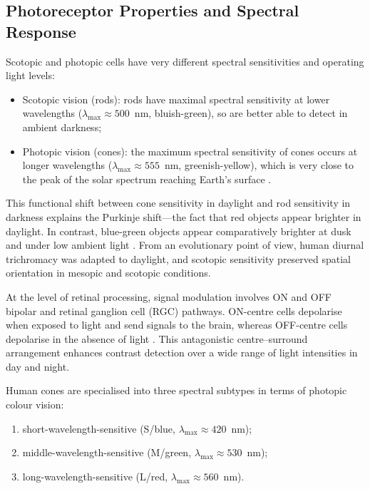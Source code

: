 \documentclass[brainsci,article,submit,moreauthors]{Definitions/mdpi}
\begin{document}
\subsection{Photoreceptor Properties and Spectral Response}

Scotopic and photopic cells have very different spectral sensitivities and operating light levels:

\begin{itemize}
\item Scotopic vision (rods): rods have maximal spectral sensitivity at lower wavelengths ($\lambda_{\max} \approx 500$~nm, bluish-green), so are better able to detect in ambient darkness;
\item Photopic vision (cones): the maximum spectral sensitivity of cones occurs at longer wavelengths ($\lambda_{\max} \approx 555$~nm, greenish-yellow), which is very close to the peak of the solar spectrum reaching Earth's surface \citep{stockman2000}.
\end{itemize}

This functional shift between cone sensitivity in daylight and rod sensitivity in darkness explains the Purkinje shift---the fact that red objects appear brighter in daylight. In contrast, blue-green objects appear comparatively brighter at dusk and under low ambient light \citep{purkinje1825,lamb2013}. From an evolutionary point of view, human diurnal trichromacy was adapted to daylight, and scotopic sensitivity preserved spatial orientation in mesopic and scotopic conditions.

At the level of retinal processing, signal modulation involves ON and OFF bipolar and retinal ganglion cell (RGC) pathways. ON-centre cells depolarise when exposed to light and send signals to the brain, whereas OFF-centre cells depolarise in the absence of light \citep{werblin1969,masland2012}. This antagonistic centre--surround arrangement enhances contrast detection over a wide range of light intensities in day and night.

Human cones are specialised into three spectral subtypes in terms of photopic colour vision:
\begin{enumerate}
\item short-wavelength-sensitive (S/blue, $\lambda_{\max} \approx 420$~nm);
\item middle-wavelength-sensitive (M/green, $\lambda_{\max} \approx 530$~nm);
\item long-wavelength-sensitive (L/red, $\lambda_{\max} \approx 560$~nm).
\end{enumerate}
\end{document}
